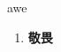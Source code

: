 
\begin{frame}
{\huge awe}
\begin{center}
\begin{enumerate}\Large
  \item \textbf{敬畏}
\end{enumerate}
\end{center}
\end{frame}
